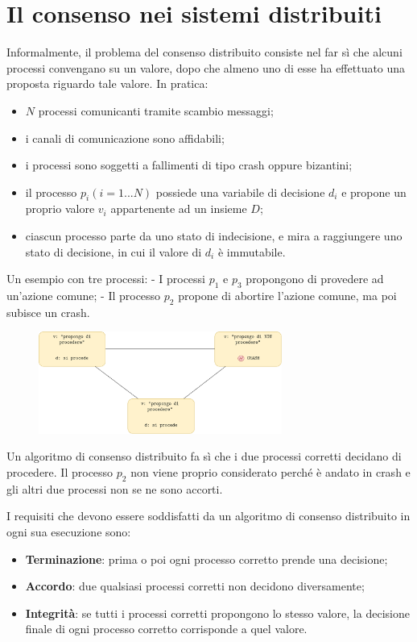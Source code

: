 \section{Il consenso nei sistemi distribuiti}
Informalmente, il problema del consenso distribuito consiste nel far sì che alcuni processi convengano su un valore, dopo che almeno uno di esse ha effettuato una proposta riguardo tale valore. In pratica:
\begin{itemize}
    \item $N$ processi comunicanti tramite scambio messaggi;
    \item i canali di comunicazione sono affidabili;
    \item i processi sono soggetti a fallimenti di tipo crash oppure bizantini;
    \item il processo $p_{i} (i=1 ... N)$ possiede una variabile di decisione $d_{i}$ e propone un proprio valore $v_{i}$ appartenente ad un insieme $D$;
    \item ciascun processo parte da uno stato di indecisione, e mira a raggiungere uno stato di decisione, in cui il valore di $d_{i}$ è immutabile.
\end{itemize}

Un esempio con tre processi: \newline
- I processi $p_{1}$ e $p_{3}$ propongono di provedere ad un'azione comune; \newline
- Il processo $p_{2}$ propone di abortire l'azione comune, ma poi subisce un crash.

\begin{figure}[ht]
    \centering
    \includegraphics[width=8cm]{./Images/cap2/2.3.png}
    \label{fig:image2.3}
\end{figure}

Un algoritmo di consenso distribuito fa sì che i due processi corretti decidano di procedere. Il processo $p_{2}$ non viene proprio considerato perché è andato in crash e gli altri due processi non se ne sono accorti.

I requisiti che devono essere soddisfatti da un algoritmo di consenso distribuito in ogni sua esecuzione sono:
\begin{itemize}
    \item \textbf{Terminazione}: prima o poi ogni processo corretto prende una decisione;
    \item \textbf{Accordo}: due qualsiasi processi corretti non decidono diversamente;
    \item  \textbf{Integrità}: se tutti i processi corretti propongono lo stesso valore, la decisione finale di ogni processo corretto corrisponde a quel valore.
\end{itemize}

